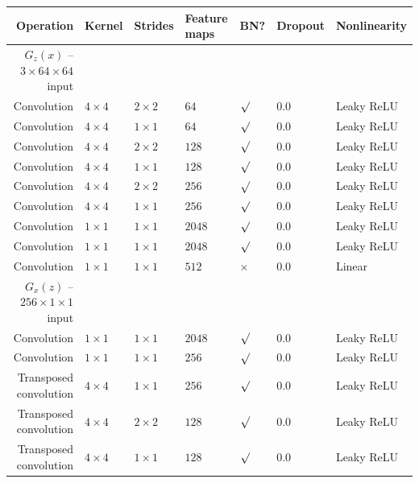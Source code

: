 \documentclass{article}
\begin{document}
{\begin{table}[h]
\centering
\begin{tabular}{@{}rllllll@{}} \toprule
Operation              & Kernel       & Strides      & Feature maps & BN?          & Dropout & Nonlinearity \\ \midrule
$G_z(x)$ -- $3 \times 64 \times 64$ input                                                                 \\
Convolution            & $4 \times 4$ & $2 \times 2$ & $64$         & $\surd$      & 0.0     & Leaky ReLU \\
Convolution            & $4 \times 4$ & $1 \times 1$ & $64$         & $\surd$      & 0.0     & Leaky ReLU \\
Convolution            & $4 \times 4$ & $2 \times 2$ & $128$        & $\surd$      & 0.0     & Leaky ReLU \\
Convolution            & $4 \times 4$ & $1 \times 1$ & $128$        & $\surd$      & 0.0     & Leaky ReLU \\
Convolution            & $4 \times 4$ & $2 \times 2$ & $256$        & $\surd$      & 0.0     & Leaky ReLU \\
Convolution            & $4 \times 4$ & $1 \times 1$ & $256$        & $\surd$      & 0.0     & Leaky ReLU \\
Convolution            & $1 \times 1$ & $1 \times 1$ & $2048$       & $\surd$      & 0.0     & Leaky ReLU \\
Convolution            & $1 \times 1$ & $1 \times 1$ & $2048$       & $\surd$      & 0.0     & Leaky ReLU \\
Convolution            & $1 \times 1$ & $1 \times 1$ & $512$        & $\times$     & 0.0     & Linear     \\
$G_x(z)$ -- $256 \times 1 \times 1$ input                                                                 \\
Convolution            & $1 \times 1$ & $1 \times 1$ & $2048$       & $\surd$      & 0.0     & Leaky ReLU \\
Convolution            & $1 \times 1$ & $1 \times 1$ & $256$        & $\surd$      & 0.0     & Leaky ReLU \\
Transposed convolution & $4 \times 4$ & $1 \times 1$ & $256$        & $\surd$      & 0.0     & Leaky ReLU \\
Transposed convolution & $4 \times 4$ & $2 \times 2$ & $128$        & $\surd$      & 0.0     & Leaky ReLU \\
Transposed convolution & $4 \times 4$ & $1 \times 1$ & $128$        & $\surd$      & 0.0     & Leaky ReLU \\

\end{tabular}
\end{table}}
\end{document}
